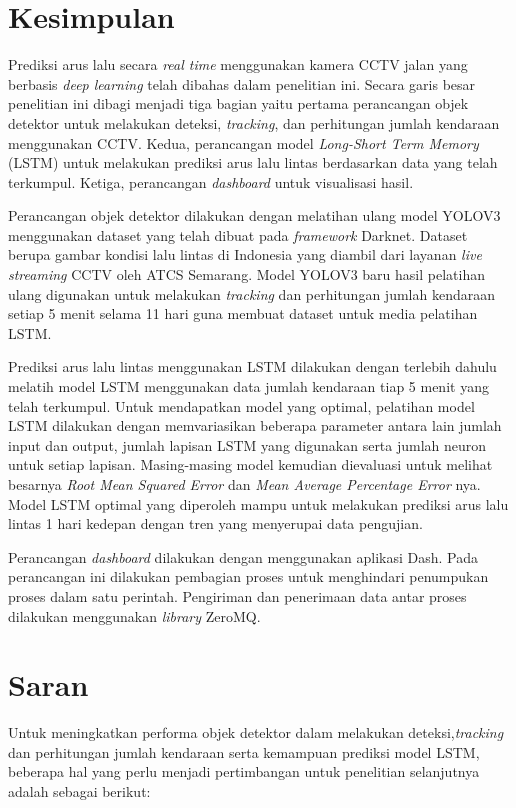 \documentclass[../thesis.tex]{subfiles}
\begin{document}
\section{Kesimpulan}
Prediksi arus lalu secara \textit{real time} menggunakan kamera CCTV jalan yang berbasis \textit{deep learning} telah dibahas dalam penelitian ini. Secara garis besar penelitian ini dibagi menjadi tiga bagian yaitu
pertama perancangan objek detektor untuk melakukan deteksi, \textit{tracking}, dan perhitungan jumlah kendaraan menggunakan CCTV. Kedua, perancangan model \textit{Long-Short Term Memory} (LSTM) untuk melakukan prediksi arus lalu lintas berdasarkan data yang telah terkumpul. Ketiga, perancangan \textit{dashboard} untuk
visualisasi hasil.

Perancangan objek detektor dilakukan dengan melatihan ulang model YOLOV3 menggunakan dataset yang telah dibuat pada \textit{framework} Darknet. 
Dataset berupa gambar kondisi lalu lintas di Indonesia yang diambil dari layanan \textit{live streaming} CCTV oleh ATCS Semarang. Model YOLOV3 baru hasil pelatihan ulang digunakan untuk
melakukan \textit{tracking} dan perhitungan jumlah kendaraan setiap 5 menit selama 11 hari guna membuat dataset untuk media pelatihan LSTM.

Prediksi arus lalu lintas menggunakan LSTM dilakukan dengan terlebih dahulu melatih model LSTM menggunakan data jumlah kendaraan tiap 5 menit yang telah terkumpul. Untuk mendapatkan model yang optimal, pelatihan model LSTM dilakukan dengan 
memvariasikan beberapa parameter antara lain jumlah input dan output, jumlah lapisan LSTM yang digunakan serta jumlah neuron untuk setiap lapisan. Masing-masing model kemudian dievaluasi untuk melihat besarnya \textit{Root Mean Squared Error} dan 
\textit{Mean Average Percentage Error} nya. Model LSTM optimal yang diperoleh mampu untuk melakukan prediksi arus lalu lintas 1 hari kedepan dengan tren yang menyerupai data pengujian.

Perancangan \textit{dashboard} dilakukan dengan menggunakan aplikasi Dash. Pada perancangan ini dilakukan pembagian proses untuk menghindari penumpukan proses dalam satu perintah. Pengiriman dan penerimaan data antar proses dilakukan menggunakan \textit{library} ZeroMQ. 

\section{Saran}

Untuk meningkatkan performa objek detektor dalam melakukan deteksi,\textit{tracking} dan perhitungan jumlah kendaraan serta kemampuan prediksi model LSTM, beberapa hal yang perlu menjadi
pertimbangan untuk penelitian selanjutnya adalah sebagai berikut:
\end{document}
